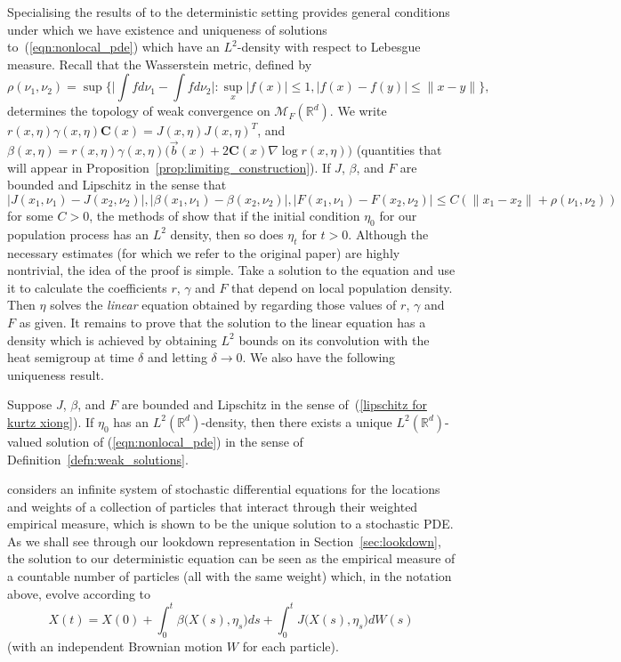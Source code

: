 \documentclass[EJP]{ejpecp} %
\newcommand{\IR}{\mathbb R}
\newcommand{\meanq}{\vec b}    %
\newcommand{\covq}{\mathbf{C}}     %
\newcommand{\measures}{\mathcal{M}_F(\IR^d)} %
\newcommand{\citet}[1]{\cite{#1}}
\begin{document}
Specialising the results of 
\citet{kurtz/xiong:1999} to the deterministic setting
provides general conditions under which we
have existence and uniqueness of solutions to~(\ref{eqn:nonlocal_pde}) which
have an $L^2$-density with respect to Lebesgue measure. 
Recall that the Wasserstein metric, defined by 
\[\rho (\nu_1,\nu_2)=\sup\Big\{\Big|\int fd\nu_1-\int fd\nu_2\Big|:\sup_x|f(x
)|\leq 1,|f(x)-f(y)|\leq \|x-y\|\Big\},\]
determines the topology of weak convergence on $\measures$.
We write 
$r(x,\eta) \gamma(x,\eta) \covq(x) = J(x,\eta) J(x,\eta)^T$, and 
$\beta(x,\eta) = r(x,\eta) \gamma(x,\eta) \big(\meanq(x)+2\covq(x)\nabla\log r(x,\eta)\big)$
(quantities that will appear in Proposition~\ref{prop:limiting_construction}).
If $J$, $\beta$, and $F$ are bounded and Lipschitz in the sense 
that
\begin{equation}
\label{lipschitz for kurtz xiong}
|J (x_1, \nu_1)-J (x_2, \nu_2)|,|\beta (x_1,\nu_1)-\beta 
	(x_2,\nu_2)|, |F(x_1,\nu_1)-F(x_2,\nu_2)|
	\leq C(\|x_1-x_2\|+\rho (\nu_ 1,\nu_2))
\end{equation}
for some $C>0$,   
the methods of \citet{kurtz/xiong:1999} show that %
if the initial condition $\eta_0$ for our 
population process has
an $L^2$ density, then so does $\eta_t$ for $t>0$. 
Although the necessary estimates (for which we refer to the original paper)
are highly nontrivial, 
the idea of the proof is simple. Take a solution to the
equation and use it to calculate the coefficients $r$, $\gamma$ and $F$ that depend
on local population density. Then $\eta$ solves the 
{\em linear} equation obtained by regarding those values of $r$, $\gamma$ and $F$ as given.
It remains to prove that the solution to the linear equation has a density
which is achieved by obtaining
$L^2$ bounds on its convolution with the heat semigroup at time $\delta$ and letting 
$\delta\to 0$.
We also have the following uniqueness result.
\begin{theorem}[Special case of \citet{kurtz/xiong:1999}, Theorem~3.5]
	\label{thm:kurtzxiong}
Suppose  $J$, $\beta$, and $F$ are bounded and Lipschitz in the sense 
of~(\ref{lipschitz for kurtz xiong}).
If $\eta_0$ has an $L^2({\mathbb R}^d)$-density, then there 
exists a unique $L^2({\mathbb R}^d)$-valued  
	solution of (\ref{eqn:nonlocal_pde}) in the sense of 
	Definition~\ref{defn:weak_solutions}.
\end{theorem}
\begin{remark}
\citet{kurtz/xiong:1999} considers an infinite system of stochastic differential equations
for the locations and weights of a collection of particles that interact through their 
weighted empirical measure, which is shown to be the unique solution to a stochastic
	PDE. As we shall see through our lookdown representation in 
Section~\ref{sec:lookdown}, the
	solution to our
	deterministic equation can be seen as the empirical measure of a 
	countable number of particles (all with the same weight)
which, in the notation above, evolve according
	to 
	\[X(t)=X(0)+\int_0^t\beta\big(X(s), \eta_s\big)ds
+\int_0^tJ\big(X(s), \eta_s\big)dW(s)\]
	(with an independent Brownian motion $W$ for each particle).
\end{remark}
\end{document}
